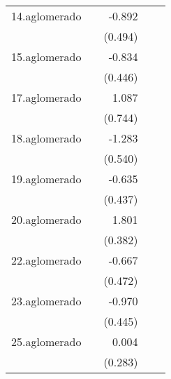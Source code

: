 {\begin{longtable}{l*{4}{D{.}{.}{-1}}}
\addlinespace
14.aglomerado&                     &      -0.892         &                     &                     \\
            &                     &     (0.494)         &                     &                     \\
\addlinespace
15.aglomerado&                     &      -0.834         &                     &                     \\
            &                     &     (0.446)         &                     &                     \\
\addlinespace
17.aglomerado&                     &       1.087         &                     &                     \\
            &                     &     (0.744)         &                     &                     \\
\addlinespace
18.aglomerado&                     &      -1.283\sym{*}  &                     &                     \\
            &                     &     (0.540)         &                     &                     \\
\addlinespace
19.aglomerado&                     &      -0.635         &                     &                     \\
            &                     &     (0.437)         &                     &                     \\
\addlinespace
20.aglomerado&                     &       1.801\sym{***}&                     &                     \\
            &                     &     (0.382)         &                     &                     \\
\addlinespace
22.aglomerado&                     &      -0.667         &                     &                     \\
            &                     &     (0.472)         &                     &                     \\
\addlinespace
23.aglomerado&                     &      -0.970\sym{*}  &                     &                     \\
            &                     &     (0.445)         &                     &                     \\
\addlinespace
25.aglomerado&                     &       0.004         &                     &                     \\
            &                     &     (0.283)         &                     &                     \\

\end{longtable}}
